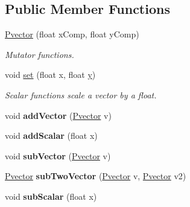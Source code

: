 \subsection*{Public Member Functions}
\begin{DoxyCompactItemize}
\item 
\hyperlink{class_pvector_ada1a9423d48f67838d625ddf62149bcf}{Pvector} (float x\+Comp, float y\+Comp)\hypertarget{class_pvector_ada1a9423d48f67838d625ddf62149bcf}{}\label{class_pvector_ada1a9423d48f67838d625ddf62149bcf}

\begin{DoxyCompactList}\small\item\em Mutator functions. \end{DoxyCompactList}\item 
void \hyperlink{class_pvector_a77eb246570e459227cb4c317af0012b7}{set} (float x, float \hyperlink{class_pvector_ab9d5ab87022aa781382b8eb4b944b375}{y})\hypertarget{class_pvector_a77eb246570e459227cb4c317af0012b7}{}\label{class_pvector_a77eb246570e459227cb4c317af0012b7}

\begin{DoxyCompactList}\small\item\em Scalar functions scale a vector by a float. \end{DoxyCompactList}\item 
void {\bfseries add\+Vector} (\hyperlink{class_pvector}{Pvector} v)\hypertarget{class_pvector_aacdb0c22529bdfa27907013843f78963}{}\label{class_pvector_aacdb0c22529bdfa27907013843f78963}

\item 
void {\bfseries add\+Scalar} (float x)\hypertarget{class_pvector_ab130e1e66e4a33ecf370203e43de191c}{}\label{class_pvector_ab130e1e66e4a33ecf370203e43de191c}

\item 
void {\bfseries sub\+Vector} (\hyperlink{class_pvector}{Pvector} v)\hypertarget{class_pvector_a11ea8cbdc8cc308d5509d5bb85142001}{}\label{class_pvector_a11ea8cbdc8cc308d5509d5bb85142001}

\item 
\hyperlink{class_pvector}{Pvector} {\bfseries sub\+Two\+Vector} (\hyperlink{class_pvector}{Pvector} v, \hyperlink{class_pvector}{Pvector} v2)\hypertarget{class_pvector_a255e0fda569608930ed7986763f6ab85}{}\label{class_pvector_a255e0fda569608930ed7986763f6ab85}

\item 
void {\bfseries sub\+Scalar} (float x)\hypertarget{class_pvector_a0b07f3f6bbdf88179a0aac0bc58b73e1}{}\label{class_pvector_a0b07f3f6bbdf88179a0aac0bc58b73e1}


\end{DoxyCompactItemize}
